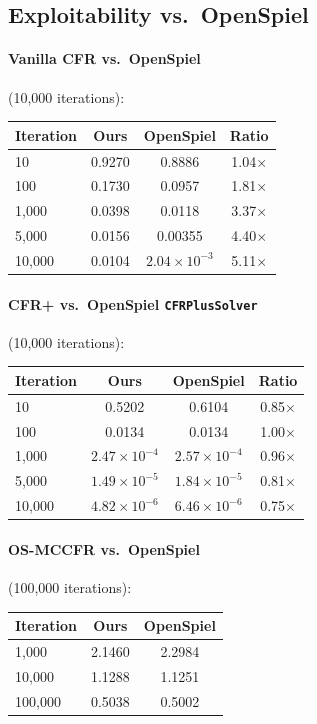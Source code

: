 \documentclass[11pt]{article}
\newcommand{\code}[1]{\texttt{#1}}
\begin{document}
\subsection*{Exploitability vs.\ OpenSpiel}

\paragraph{Vanilla CFR vs.\ OpenSpiel} (10{,}000 iterations):
\begin{center}
\begin{tabular}{lccc}
\toprule
Iteration & Ours & OpenSpiel & Ratio \\
\midrule
10 & 0.9270 & 0.8886 & 1.04$\times$ \\
100 & 0.1730 & 0.0957 & 1.81$\times$ \\
1{,}000 & 0.0398 & 0.0118 & 3.37$\times$ \\
5{,}000 & 0.0156 & 0.00355 & 4.40$\times$ \\
10{,}000 & 0.0104 & $2.04\times10^{-3}$ & 5.11$\times$ \\
\bottomrule
\end{tabular}
\end{center}

\paragraph{CFR+ vs.\ OpenSpiel \code{CFRPlusSolver}} (10{,}000 iterations):
\begin{center}
\begin{tabular}{lccc}
\toprule
Iteration & Ours & OpenSpiel & Ratio \\
\midrule
10 & 0.5202 & 0.6104 & 0.85$\times$ \\
100 & 0.0134 & 0.0134 & 1.00$\times$ \\
1{,}000 & $2.47\times10^{-4}$ & $2.57\times10^{-4}$ & 0.96$\times$ \\
5{,}000 & $1.49\times10^{-5}$ & $1.84\times10^{-5}$ & 0.81$\times$ \\
10{,}000 & $4.82\times10^{-6}$ & $6.46\times10^{-6}$ & 0.75$\times$ \\
\bottomrule
\end{tabular}
\end{center}

\paragraph{OS-MCCFR vs.\ OpenSpiel} (100{,}000 iterations):
\begin{center}
\begin{tabular}{lcc}
\toprule
Iteration & Ours & OpenSpiel \\
\midrule
1{,}000 & 2.1460 & 2.2984 \\
10{,}000 & 1.1288 & 1.1251 \\
100{,}000 & 0.5038 & 0.5002 \\
\bottomrule
\end{tabular}
\end{center}
\end{document}
